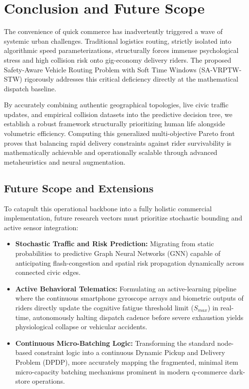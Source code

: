 \documentclass[10pt,twocolumn,letterpaper]{article}
\begin{document}
\section{Conclusion and Future Scope}

The convenience of quick commerce has inadvertently triggered a wave of systemic urban challenges. Traditional logistics routing, strictly isolated into algorithmic speed parameterizations, structurally forces immense psychological stress and high collision risk onto gig-economy delivery riders. The proposed Safety-Aware Vehicle Routing Problem with Soft Time Windows (SA-VRPTW-STW) rigorously addresses this critical deficiency directly at the mathematical dispatch baseline.

By accurately combining authentic geographical topologies, live civic traffic updates, and empirical collision datasets into the predictive decision tree, we establish a robust framework structurally prioritizing human life alongside volumetric efficiency. Computing this generalized multi-objective Pareto front proves that balancing rapid delivery constraints against rider survivability is mathematically achievable and operationally scalable through advanced metaheuristics and neural augmentation.

\subsection{Future Scope and Extensions}
To catapult this operational backbone into a fully holistic commercial implementation, future research vectors must prioritize stochastic bounding and active sensor integration:
\begin{itemize}
    \item \textbf{Stochastic Traffic and Risk Prediction:} Migrating from static probabilities to predictive Graph Neural Networks (GNN) capable of anticipating flash-congestion and spatial risk propagation dynamically across connected civic edges.
    \item \textbf{Active Behavioral Telematics:} Formulating an active-learning pipeline where the continuous smartphone gyroscope arrays and biometric outputs of riders directly update the cognitive fatigue threshold limit ($S_{max}$) in real-time, autonomously halting dispatch cadence before severe exhaustion yields physiological collapse or vehicular accidents.
    \item \textbf{Continuous Micro-Batching Logic:} Transforming the standard node-based constraint logic into a continuous Dynamic Pickup and Delivery Problem (DPDP), more accurately mapping the fragmented, minimal item micro-capacity batching mechanisms prominent in modern q-commerce dark-store operations.
\end{itemize}
\end{document}
